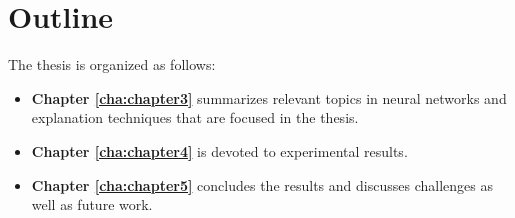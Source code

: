 
\clearpage

\section{Outline}
The thesis is organized as follows:
\begin{itemize}
	\item \textbf{Chapter \ref{cha:chapter3}} summarizes relevant topics in  neural networks and explanation techniques that are focused in the thesis.
	\item \textbf{Chapter \ref{cha:chapter4}} is devoted to experimental results.
	\item \textbf{Chapter \ref{cha:chapter5}} concludes the results and discusses challenges as well as future work.
\end{itemize}


